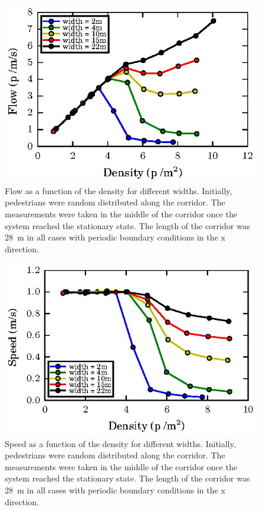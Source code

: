 \begin{figure}[htbp!]
\includegraphics[width=\columnwidth]
{plots/flow-density_vd1_multiple_widths.eps}
\caption{\label{fundamental_diagram_flow} Flow as a function of the density for different widths. Initially, 
pedestrians were random distributed along the corridor. The measurements were taken in the middle
of the corridor once the system reached the stationary state. The length of the corridor 
was 28~m in all cases with periodic boundary conditions in the x direction.}
\end{figure}


\begin{figure}[htbp!]
\includegraphics[width=\columnwidth]
{plots/speed-density_vd1_multiple_widths.eps}
\caption{\label{fundamental_diagram_speed} Speed as a function of the density for different widths. Initially, 
pedestrians were random distributed along the corridor. The measurements were taken in the middle
of the corridor once the system reached the stationary state. The length of the corridor 
was 28~m in all cases with periodic boundary conditions in the x direction.}
\end{figure}


